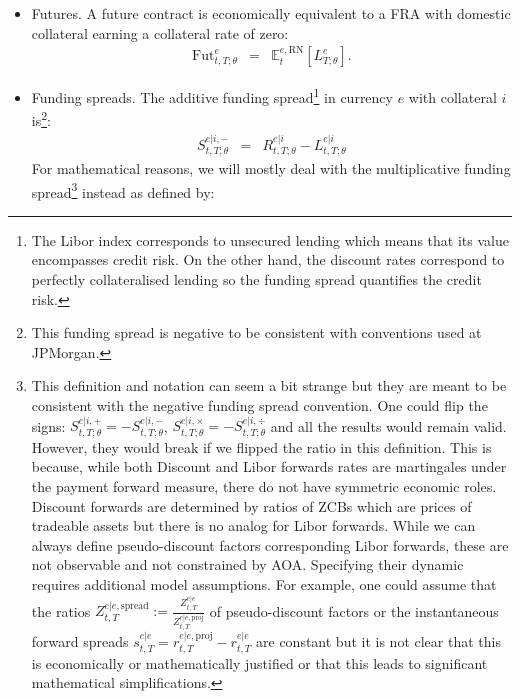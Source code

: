 \documentclass[11pt,english]{amsart}
\newcommand{\RN}{\mathrm{RN}}
\newcommand{\EE}{\mathbb{E}}
\theoremstyle{definition}
\begin{document}
\begin{itemize}
We keep the notation of forward Libors for the forward of any coupon factor: under collateral $i$,
\begin{eqnarray}
  1+\theta L^{e|i}_{t,a;\theta} &:=& \EE^{e|i,b}_t\left[C^e_{a,b}\right] ,
  \label{eq:forward_coupon}
\end{eqnarray}
which is \eqref{eq:forward_libor} for a Libor coupon. So the formulas below for swaps and cross-currency swaps hold for both coupon types, with the coupon convexity of the coupon type (\autoref{prop:coupon_collateral_convexity}).
\item Futures. A future contract is economically equivalent to a FRA with domestic collateral earning a collateral rate of zero:
\begin{eqnarray}
  \mathrm{Fut}^{e}_{t,T;\theta} &=& \EE^{e,\RN}_t \left[L^e_{T;\theta}\right] .
\label{eq:future}
\end{eqnarray} 
\item Funding spreads. The additive funding spread\footnote{The Libor index corresponds to unsecured lending which means that its value encompasses credit risk. On the other hand, the discount rates correspond to perfectly collateralised lending so the funding spread quantifies the credit risk.} in currency $e$ with collateral $i$ is\footnote{This funding spread is negative to be consistent with conventions used at JPMorgan.}:
\begin{eqnarray}
	S^{e|i,-}_{t,T;\theta} &=& R^{e|i}_{t,T;\theta}  - L^{e|i}_{t,T;\theta} 
	\label{eq:additive_funding_spread}
\end{eqnarray} 
For mathematical reasons, we will mostly deal with the multiplicative funding spread\footnote{This definition and notation can seem a bit strange but they are meant to be consistent with the negative funding spread convention. One could flip the signs: $S^{e|i,+}_{t,T;\theta} = -S^{e|i,-}_{t,T;\theta}$, $S^{e|i,\times}_{t,T;\theta} =  - S^{e|i,\div}_{t,T;\theta}$ and all the results would remain valid. However, they would break if we flipped the ratio in this definition. This is because, while both Discount and Libor forwards rates are martingales under the payment forward measure, there do not have symmetric economic roles. Discount forwards are determined by ratios of ZCBs which are prices of tradeable assets but there is no analog for Libor forwards. While we can always define pseudo-discount factors corresponding Libor forwards, these are not observable and not constrained by AOA. Specifying their dynamic requires additional model assumptions. For example, one could assume that the ratios $Z^{e|e,\mathrm{spread}}_{t,T} := \frac{Z^{e|e}_{t,T}}{Z^{e|e,\mathrm{proj}}_{t,T}}$  of pseudo-discount factors or the instantaneous forward spreads $s^{e|e}_{t,T} = r^{e|e,\mathrm{proj}}_{t,T} - r^{e|e}_{t,T}$ are constant but it is not clear that this is economically or mathematically justified or that this leads to significant mathematical simplifications.} instead as defined by:

\end{itemize}
\end{document}

